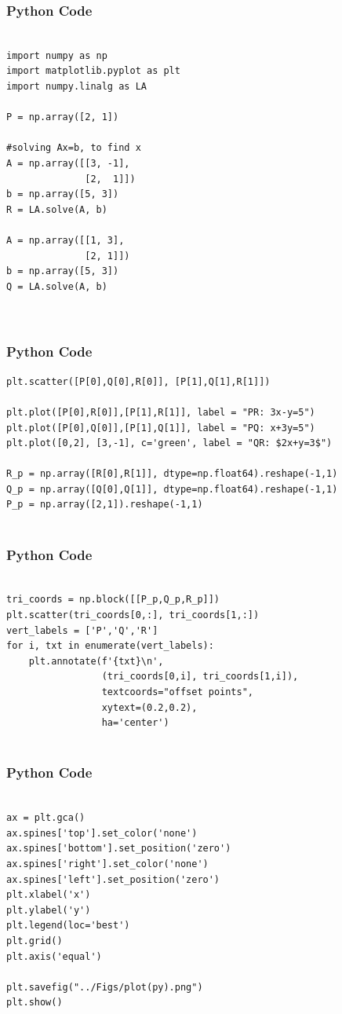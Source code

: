 \documentclass{beamer}
\begin{document}


\begin{frame}[fragile]
    \frametitle{Python Code}
    \begin{lstlisting}

import numpy as np
import matplotlib.pyplot as plt
import numpy.linalg as LA

P = np.array([2, 1])

#solving Ax=b, to find x
A = np.array([[3, -1],
              [2,  1]])
b = np.array([5, 3])
R = LA.solve(A, b)

A = np.array([[1, 3],
              [2, 1]])
b = np.array([5, 3])
Q = LA.solve(A, b)



\end{lstlisting}
\end{frame}

\begin{frame}[fragile]
    \frametitle{Python Code}
    \begin{lstlisting}
plt.scatter([P[0],Q[0],R[0]], [P[1],Q[1],R[1]])

plt.plot([P[0],R[0]],[P[1],R[1]], label = "PR: 3x-y=5")
plt.plot([P[0],Q[0]],[P[1],Q[1]], label = "PQ: x+3y=5")
plt.plot([0,2], [3,-1], c='green', label = "QR: $2x+y=3$")

R_p = np.array([R[0],R[1]], dtype=np.float64).reshape(-1,1)
Q_p = np.array([Q[0],Q[1]], dtype=np.float64).reshape(-1,1)
P_p = np.array([2,1]).reshape(-1,1)


\end{lstlisting}
\end{frame}

\begin{frame}[fragile]
    \frametitle{Python Code}
    \begin{lstlisting}

tri_coords = np.block([[P_p,Q_p,R_p]])
plt.scatter(tri_coords[0,:], tri_coords[1,:])
vert_labels = ['P','Q','R']
for i, txt in enumerate(vert_labels):
    plt.annotate(f'{txt}\n',
                 (tri_coords[0,i], tri_coords[1,i]), 
                 textcoords="offset points", 
                 xytext=(0.2,0.2), 
                 ha='center') 


\end{lstlisting}
\end{frame}

\begin{frame}[fragile]
    \frametitle{Python Code}
    \begin{lstlisting}

ax = plt.gca()
ax.spines['top'].set_color('none')
ax.spines['bottom'].set_position('zero')
ax.spines['right'].set_color('none')
ax.spines['left'].set_position('zero')
plt.xlabel('x')
plt.ylabel('y')
plt.legend(loc='best')
plt.grid()
plt.axis('equal')

plt.savefig("../Figs/plot(py).png")
plt.show()

\end{lstlisting}
\end{frame}
\end{document}
